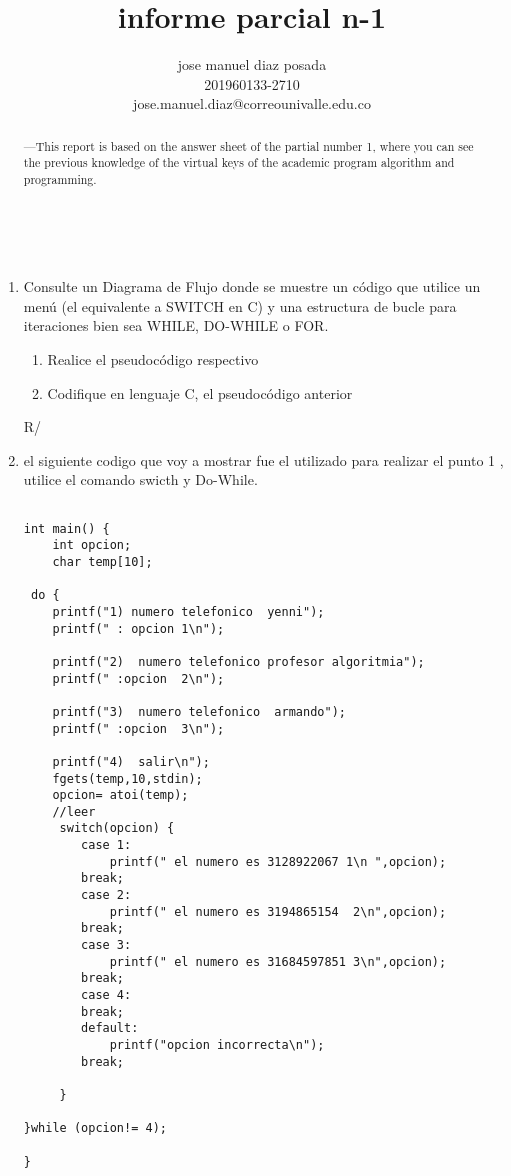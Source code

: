 \documentclass[ twoside,twocolumn,9pt, letterpape]{article}
\date{} %
\title{\huge\textbf{informe parcial n-1}}
\author{
jose manuel diaz posada\\
201960133-2710\\
jose.manuel.diaz@correounivalle.edu.co\\
}
\begin{document}
\maketitle
\small %
\begin{abstract} —This report is based on the answer sheet of the partial number 1, where you can see the previous knowledge of the virtual keys of the academic program algorithm and programming.
\end{abstract}
\\
\noindent
\begin{enumerate}
\item Consulte un Diagrama de Flujo donde se muestre un código que utilice un menú (el equivalente a SWITCH  en C) y una estructura de bucle para iteraciones bien sea WHILE, DO-WHILE o FOR. 

\begin{enumerate}
\item   Realice el pseudocódigo respectivo
\item  Codifique en lenguaje C, el pseudocódigo anterior 
\end{enumerate}    
R/
\item el siguiente codigo que voy a mostrar fue el utilizado para realizar el punto 1 , utilice el comando swicth y Do-While.


\begin{verbatim}

int main() {
    int opcion;
	char temp[10];

 do {
 	printf("1) numero telefonico  yenni");
 	printf(" : opcion 1\n");
 	
 	printf("2)  numero telefonico profesor algoritmia");
 	printf(" :opcion  2\n");
 	
 	printf("3)  numero telefonico  armando");
 	printf(" :opcion  3\n");
 	
 	printf("4)  salir\n");
 	fgets(temp,10,stdin);
 	opcion= atoi(temp);
 	//leer
 	 switch(opcion) {
 	 	case 1:
 	 		printf(" el numero es 3128922067 1\n ",opcion);
 	 	break;
 	 	case 2:
 	 		printf(" el numero es 3194865154  2\n",opcion);
 	 	break;
 	 	case 3:
 	 		printf(" el numero es 31684597851 3\n",opcion);
 	 	break;	
 	    case 4:
 	    break;
 	 	default:
 	 		printf("opcion incorrecta\n");	
 	 	break;
 	 	
 	 }
 	    
}while (opcion!= 4);

}


\end{verbatim}
\end{enumerate}
\end{document}
